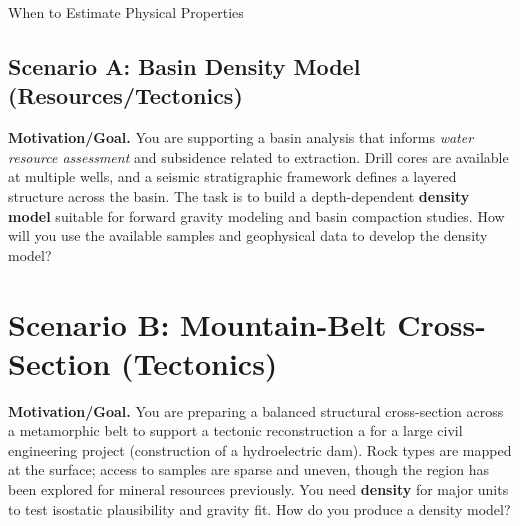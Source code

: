 \begin{activity}{When to Estimate Physical Properties}

\newpage
\subsection*{Scenario A: Basin Density Model (Resources/Tectonics)}
\noindent\textbf{Motivation/Goal.} You are supporting a basin analysis that informs \emph{water resource assessment} and subsidence related to extraction. Drill cores are available at multiple wells, and a seismic stratigraphic framework defines a layered structure across the basin. The task is to build a depth-dependent \textbf{density model} suitable for forward gravity modeling and basin compaction studies.  How will you use the available samples and geophysical data to develop the density model?

\yourplan{}

\newpage
\section*{Scenario B: Mountain-Belt Cross-Section (Tectonics)}
\noindent\textbf{Motivation/Goal.} You are preparing a balanced structural cross-section across a metamorphic belt to support a tectonic reconstruction a for a large civil engineering project (construction of a hydroelectric dam). Rock types are mapped at the surface; access to samples are sparse and uneven, though the region has been explored for mineral resources previously. You need \textbf{density} for major units to test isostatic plausibility and gravity fit.  How do you produce a density model?


\end{activity}

